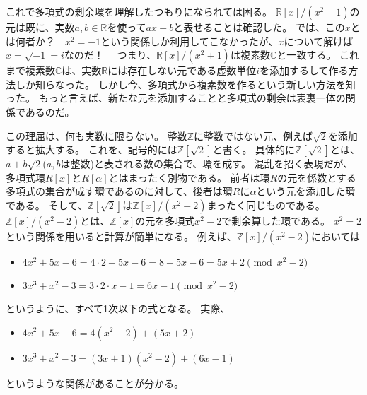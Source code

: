これで多項式の剰余環を理解したつもりになられては困る。
$\mathbb{R}[x]/(x^2+1)$の元は既に、実数$a,b \in \mathbb{R}$を使って$ax+b$と表せることは確認した。
では、この$x$とは何者か？　$x^2=-1$という関係しか利用してこなかったが、$x$について解けば$x=\sqrt{-1}=i$なのだ！　
つまり、$\mathbb{R}[x]/(x^2+1)$は複素数$\mathbb{C}$と一致する。
これまで複素数$\mathbb{C}$は、実数$\mathbb{R}$には存在しない元である虚数単位$i$を添加するして作る方法しか知らなった。
しかし今、多項式から複素数を作るという新しい方法を知った。
もっと言えば、新たな元を添加することと多項式の剰余は表裏一体の関係であるのだ。

この理屈は、何も実数に限らない。
整数$\mathbb{Z}$に整数ではない元、例えば$\sqrt{2}$を添加すると拡大する。
これを、記号的には$\mathbb{Z}[\sqrt{2}]$と書く。
具体的に$\mathbb{Z}[\sqrt{2}]$とは、$a+b\sqrt{2}$($a,b$は整数)と表される数の集合で、環を成す。
混乱を招く表現だが、多項式環$R[x]$と$R[\alpha]$とはまったく別物である。
前者は環$R$の元を係数とする多項式の集合が成す環であるのに対して、後者は環$R$に$\alpha$という元を添加した環である。
そして、$\mathbb{Z}[\sqrt{2}]$は$\mathbb{Z}[x]/(x^2-2)$まったく同じものである。
$\mathbb{Z}[x]/(x^2-2)$とは、$\mathbb{Z}[x]$の元を多項式$x^2-2$で剰余算した環である。
$x^2=2$という関係を用いると計算が簡単になる。
例えば、$\mathbb{Z}[x]/(x^2-2)$においては
\begin{itemize}
\item $4x^2+5x-6 = 4\cdot2 + 5x - 6 = 8 + 5x - 6 = 5x + 2 \pmod{x^2-2}$
\item $3x^3+x^2-3 = 3\cdot2\cdot x - 1 = 6x - 1 \pmod{x^2-2}$
\end{itemize}
というように、すべて1次以下の式となる。
実際、
\begin{itemize}
\item $4x^2 + 5x - 6 = 4(x^2 - 2) + (5x + 2)$
\item $3x^3+x^2-3 = (3x + 1)(x^2 - 2) + (6x - 1)$
\end{itemize}
というような関係があることが分かる。

